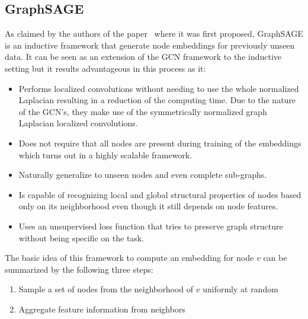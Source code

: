 


\subsection{GraphSAGE}
As claimed by the authors of the paper~\cite{graphsage} where it was first proposed, GraphSAGE is an inductive framework that generate node embeddings for previously unseen data. It can be seen as an extension of the GCN framework to the inductive setting but it results advantageous in this process as it:
\begin{itemize}
    \item Performs localized convolutions without needing to use the whole normalized Laplacian resulting in a reduction of the computing time. Due to the nature of the GCN's, they make use of the symmetrically normalized graph Laplacian localized convolutions.
    \item Does not require that all nodes are present during training of the embeddings which turns out in a highly scalable framework.
    \item Naturally generalize to unseen nodes and even complete sub-graphs.
    \item Is capable of recognizing local and global structural properties of nodes based only on its neighborhood even though it still depends on node features.
    \item Uses an unsupervised loss function that tries to preserve graph structure without being specific on the task.
\end{itemize}

The basic idea of this framework to compute an embedding for node $v$ can be summarized by the following three steps:
\begin{enumerate}
    \item Sample a set of nodes from the neighborhood of $v$ uniformly at random
    \item Aggregate feature information from neighbors
\end{enumerate}

